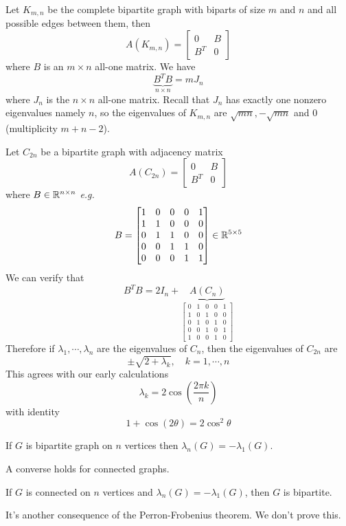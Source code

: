\begin{example}
Let \(K_{m,n}\) be the complete bipartite graph with biparts of size \(m\) and \(n\) and all possible edges between them, then
\[ A(K_{m,n})=\begin{bmatrix}0 & B \\ B^T & 0\end{bmatrix} \]
where \(B\) is an \(m\times n\) all-one matrix. We have
\[ \underbrace{B^T B}_{n\times n} = m J_n \]
where \(J_n\) is the \(n\times n\) all-one matrix.
Recall that \(J_n\) has exactly one nonzero eigenvalues namely \(n\), so the eigenvalues of \(K_{m,n}\) are \(\sqrt{mn},-\sqrt{mn}\) and 0 (multiplicity \(m+n-2\)).
\end{example}

\begin{example}
Let \(C_{2n}\) be a bipartite graph with adjacency matrix 
\[ A(C_{2n})=\begin{bmatrix}0 & B \\ B^T & 0\end{bmatrix} \]
where \(B\in\mathbb{R}^{n\times n}\) \textit{e.g.}
\[B = \begin{bmatrix}1&0&0&0&1 \\ 1&1&0&0&0 \\ 0&1&1&0&0 \\ 0&0&1&1&0 \\ 0&0&0&1&1 \end{bmatrix}\in\mathbb{R}^{5\times 5} \]
We can verify that
\[ B^T B=2I_n+\underbrace{A(C_n)}_{\begin{bmatrix}0&1&0&0&1 \\ 1&0&1&0&0 \\ 0&1&0&1&0 \\ 0&0&1&0&1 \\ 1&0&0&1&0 \end{bmatrix}} \]
Therefore if \(\lambda_1,\cdots,\lambda_n\) are the eigenvalues of \(C_n\), then the eigenvalues of \(C_{2n}\) are
\[ \pm\sqrt{2+\lambda_k}, \quad k=1,\cdots,n \]
This agrees with our early calculations
 \[ \lambda_k=2\cos\left(\frac{2\pi k}{n} \right) \]
with identity
\[ 1+\cos(2\theta)=2\cos^2\theta \]
\end{example}


\begin{corollary}
If \(G\) is bipartite graph on \(n\) vertices then \(\lambda_n(G)=-\lambda_1(G)\).
\end{corollary}
\begin{remark}
A converse holds for connected graphs.
\end{remark}
\begin{proposition}
If \(G\) is connected on \(n\) vertices and \(\lambda_n(G)=-\lambda_1(G)\), then \(G\) is bipartite.
\end{proposition}
\begin{remark}
It's another consequence of the Perron-Frobenius theorem. We don't prove this.
\end{remark}



